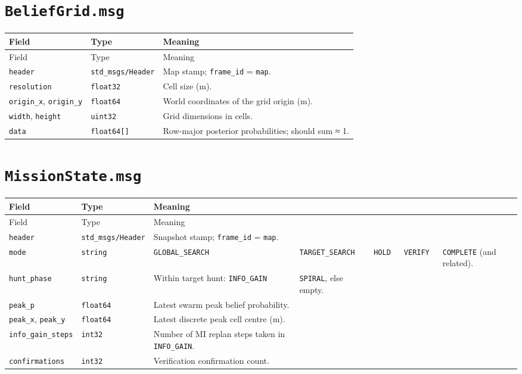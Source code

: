 \section{\texttt{BeliefGrid.msg}}


\begin{center}
\small
\begin{longtable}{@{}llp{7.2cm}@{}}
\toprule
Field & Type & Meaning \\
\midrule
\endfirsthead
\toprule
Field & Type & Meaning \\
\midrule
\endhead
\texttt{header} & \texttt{std\_msgs/Header} & Map stamp; \texttt{frame\_id} = \texttt{map}. \\
\texttt{resolution} & \texttt{float32} & Cell size (m). \\
\texttt{origin\_x}, \texttt{origin\_y} & \texttt{float64} & World coordinates of the grid origin (m). \\
\texttt{width}, \texttt{height} & \texttt{uint32} & Grid dimensions in cells. \\
\texttt{data} & \texttt{float64[]} & Row-major posterior probabilities; should sum ≈ 1. \\
\bottomrule
\end{longtable}
\end{center}


\section{\texttt{MissionState.msg}}


\begin{center}
\small
\begin{longtable}{@{}p{2.1cm}p{2.1cm}p{2.1cm}p{2.1cm}p{2.1cm}p{2.1cm}p{3.2cm}@{}}
\toprule
Field & Type & Meaning &  &  &  &  \\
\midrule
\endfirsthead
\toprule
Field & Type & Meaning &  &  &  &  \\
\midrule
\endhead
\texttt{header} & \texttt{std\_msgs/Header} & Snapshot stamp; \texttt{frame\_id} = \texttt{map}. &  &  &  &  \\
\texttt{mode} & \texttt{string} & \texttt{GLOBAL\_SEARCH} \ & \texttt{TARGET\_SEARCH} \ & \texttt{HOLD} \ & \texttt{VERIFY} \ & \texttt{COMPLETE} (and related). \\
\texttt{hunt\_phase} & \texttt{string} & Within target hunt: \texttt{INFO\_GAIN} \ & \texttt{SPIRAL}, else empty. &  &  &  \\
\texttt{peak\_p} & \texttt{float64} & Latest swarm peak belief probability. &  &  &  &  \\
\texttt{peak\_x}, \texttt{peak\_y} & \texttt{float64} & Latest discrete peak cell centre (m). &  &  &  &  \\
\texttt{info\_gain\_steps} & \texttt{int32} & Number of MI replan steps taken in \texttt{INFO\_GAIN}. &  &  &  &  \\
\texttt{confirmations} & \texttt{int32} & Verification confirmation count. &  &  &  &  \\
\bottomrule
\end{longtable}
\end{center}


